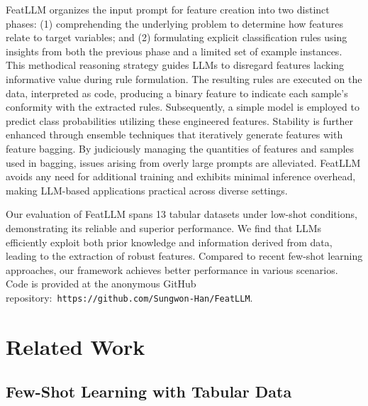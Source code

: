 \textsf{FeatLLM} organizes the input prompt for feature creation into two distinct phases: (1) comprehending the underlying problem to determine how features relate to target variables; and (2) formulating explicit classification rules using insights from both the previous phase and a limited set of example instances. This methodical reasoning strategy guides LLMs to disregard features lacking informative value during rule formulation. The resulting rules are executed on the data, interpreted as code, producing a binary feature to indicate each sample’s conformity with the extracted rules. Subsequently, a simple model is employed to predict class probabilities utilizing these engineered features. Stability is further enhanced through ensemble techniques that iteratively generate features with feature bagging. By judiciously managing the quantities of features and samples used in bagging, issues arising from overly large prompts are alleviated. \textsf{FeatLLM} avoids any need for additional training and exhibits minimal inference overhead, making LLM-based applications practical across diverse settings.

Our evaluation of \textsf{FeatLLM} spans 13 tabular datasets under low-shot conditions, demonstrating its reliable and superior performance. We find that LLMs efficiently exploit both prior knowledge and information derived from data, leading to the extraction of robust features. Compared to recent few-shot learning approaches, our framework achieves better performance in various scenarios. Code is provided at the anonymous GitHub repository:~\texttt{https://github.com/Sungwon-Han/FeatLLM}.

\section{Related Work}

\subsection{Few-Shot Learning with Tabular Data}

